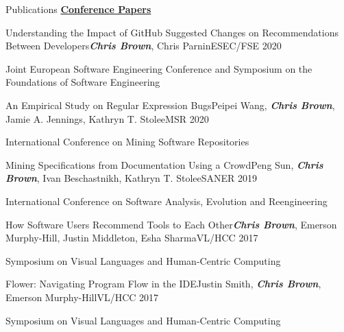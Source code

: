 \documentclass{resume} %
\begin{document}
\begin{rSection}{Publications}
\vspace{5pt}
\textbf{\underline{Conference Papers}}


\begin{pSubsection}{Understanding the Impact of GitHub Suggested Changes on Recommendations Between Developers}{}{\textit{\textbf{Chris Brown}}, Chris Parnin}{ESEC/FSE 2020}
\item Joint European Software Engineering Conference and Symposium on the Foundations of Software Engineering
\end{pSubsection}
\begin{pSubsection}{An Empirical Study on Regular Expression Bugs}{}{Peipei Wang, \textit{\textbf{Chris Brown}}, Jamie A. Jennings, Kathryn T. Stolee}{MSR 2020}
\item International Conference on Mining Software Repositories
\end{pSubsection}

\begin{pSubsection}{Mining Specifications from Documentation Using a Crowd}{}{Peng Sun, \textit{\textbf{Chris Brown}}, Ivan Beschastnikh, Kathryn T. Stolee}{SANER 2019}
\item International Conference on Software Analysis, Evolution and Reengineering 
\end{pSubsection}


\begin{pSubsection}{How Software Users Recommend Tools to Each Other}{}{\textit{\textbf{Chris Brown}}, Emerson Murphy-Hill, Justin Middleton, Esha Sharma}{VL/HCC 2017}
\item Symposium on Visual Languages and Human-Centric Computing
\end{pSubsection}


\begin{pSubsection}{Flower: Navigating Program Flow in the IDE}{}{Justin Smith, \textit{\textbf{Chris Brown}}, Emerson Murphy-Hill}{VL/HCC 2017}
\item Symposium on Visual Languages and Human-Centric Computing
\end{pSubsection}


\end{rSection}
\end{document}

